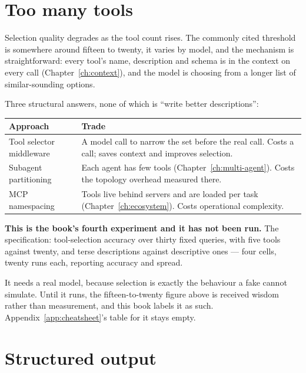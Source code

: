 \section{Too many tools}
\label{sec:tool-count}

Selection quality degrades as the tool count rises. The commonly cited threshold
is somewhere around fifteen to twenty, it varies by model, and the mechanism is
straightforward: every tool's name, description and schema is in the context on
every call (Chapter~\ref{ch:context}), and the model is choosing from a longer
list of similar-sounding options.

Three structural answers, none of which is ``write better descriptions'':

\begin{center}
\small
\begin{tabularx}{\linewidth}{@{}lX@{}}
\toprule
\textbf{Approach} & \textbf{Trade} \\
\midrule
Tool selector middleware & A model call to narrow the set before the real call.
  Costs a call; saves context and improves selection. \\[3pt]
Subagent partitioning & Each agent has few tools
  (Chapter~\ref{ch:multi-agent}). Costs the topology overhead measured there. \\[3pt]
MCP namespacing & Tools live behind servers and are loaded per task
  (Chapter~\ref{ch:ecosystem}). Costs operational complexity. \\
\bottomrule
\end{tabularx}
\end{center}

\begin{warning}
\textbf{This is the book's fourth experiment and it has not been run.} The
specification: tool-selection accuracy over thirty fixed queries, with five tools
against twenty, and terse descriptions against descriptive ones --- four cells,
twenty runs each, reporting accuracy and spread.

It needs a real model, because selection is exactly the behaviour a fake cannot
simulate. Until it runs, the fifteen-to-twenty figure above is received wisdom
rather than measurement, and this book labels it as such. Appendix~\ref{app:cheatsheet}'s
table for it stays empty.
\end{warning}

\section{Structured output}
\label{sec:structured-output}

